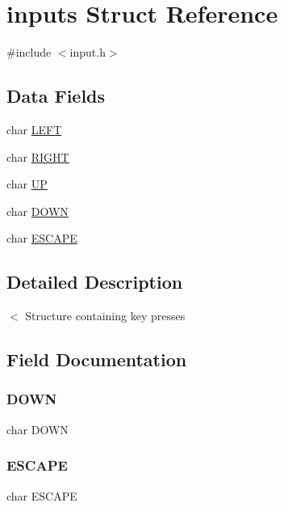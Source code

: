\hypertarget{structinputs}{}\section{inputs Struct Reference}
\label{structinputs}


{\ttfamily \#include $<$input.\+h$>$}

\subsection*{Data Fields}
\begin{DoxyCompactItemize}
\item 
char \mbox{\hyperlink{structinputs_abf3a99e39f90b8c0b0adb499e8be44cb}{L\+E\+FT}}
\item 
char \mbox{\hyperlink{structinputs_ab56909fbd462ae4fa285e24388efcf9a}{R\+I\+G\+HT}}
\item 
char \mbox{\hyperlink{structinputs_acf487aade419fe84132d0b08da4636b8}{UP}}
\item 
char \mbox{\hyperlink{structinputs_aefd805006968caf870982fabe4a6494d}{D\+O\+WN}}
\item 
char \mbox{\hyperlink{structinputs_a15675417ba5a32ad2202c86452a52010}{E\+S\+C\+A\+PE}}
\end{DoxyCompactItemize}


\subsection{Detailed Description}
$<$ Structure containing key presses 

\subsection{Field Documentation}
\mbox{\label{structinputs_aefd805006968caf870982fabe4a6494d}} 
\subsubsection{\texorpdfstring{DOWN}{DOWN}}
{\footnotesize\ttfamily char D\+O\+WN}

\mbox{\label{structinputs_a15675417ba5a32ad2202c86452a52010}} 
\subsubsection{\texorpdfstring{ESCAPE}{ESCAPE}}
{\footnotesize\ttfamily char E\+S\+C\+A\+PE}

